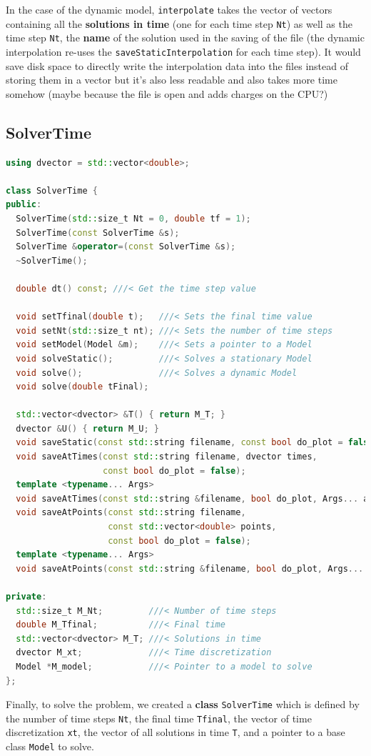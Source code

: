\documentclass{article}
\begin{document}
In the case of the dynamic model, \texttt{interpolate} takes the vector of vectors containing all the \textbf{solutions in time} (one for each time step \texttt{Nt}) as well as the time step \texttt{Nt}, the \textbf{name} of the solution used in the saving of the file (the dynamic interpolation re-uses the \texttt{saveStaticInterpolation} for each time step). It would save disk space to directly write the interpolation data into the files instead of storing them in a vector but it's also less readable and also takes more time somehow (maybe because the file is open and adds charges on the CPU?) \\


\subsection{SolverTime}
\begin{lstlisting}[language=c++]
using dvector = std::vector<double>;

class SolverTime {
public:
  SolverTime(std::size_t Nt = 0, double tf = 1);
  SolverTime(const SolverTime &s);
  SolverTime &operator=(const SolverTime &s);
  ~SolverTime();

  double dt() const; ///< Get the time step value

  void setTfinal(double t);   ///< Sets the final time value
  void setNt(std::size_t nt); ///< Sets the number of time steps
  void setModel(Model &m);    ///< Sets a pointer to a Model
  void solveStatic();         ///< Solves a stationary Model
  void solve();               ///< Solves a dynamic Model 
  void solve(double tFinal);

  std::vector<dvector> &T() { return M_T; } 
  dvector &U() { return M_U; }              
  void saveStatic(const std::string filename, const bool do_plot = false);
  void saveAtTimes(const std::string filename, dvector times,
                   const bool do_plot = false);
  template <typename... Args>
  void saveAtTimes(const std::string &filename, bool do_plot, Args... args);
  void saveAtPoints(const std::string filename,
                    const std::vector<double> points,
                    const bool do_plot = false);
  template <typename... Args>
  void saveAtPoints(const std::string &filename, bool do_plot, Args... args);

private:
  std::size_t M_Nt;         ///< Number of time steps
  double M_Tfinal;          ///< Final time
  std::vector<dvector> M_T; ///< Solutions in time
  dvector M_xt;             ///< Time discretization
  Model *M_model;           ///< Pointer to a model to solve
};
\end{lstlisting}
Finally, to solve the problem, we created a \textbf{class} \texttt{SolverTime} which is defined by the number of time steps \texttt{Nt}, the final time \texttt{Tfinal}, the vector of time discretization \texttt{xt}, the vector of all solutions in time \texttt{T}, and a pointer to a base class \texttt{Model} to solve.\\
\end{document}
